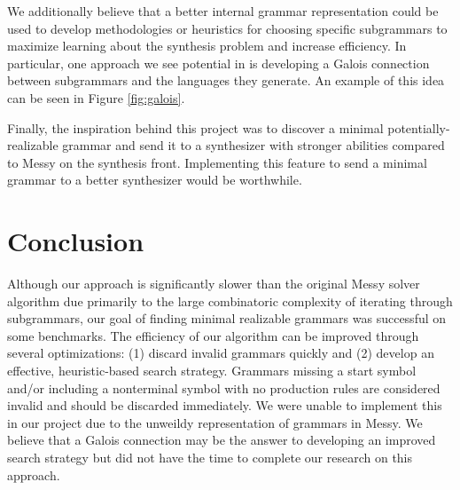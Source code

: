 \documentclass[acmsmall, nonacm]{acmart}
\begin{document}
We additionally believe that a better internal grammar representation could be used to develop methodologies or heuristics for choosing specific subgrammars to maximize learning about the synthesis problem and increase efficiency. In particular, one approach we see potential in is developing a Galois connection between subgrammars and the languages they generate. An example of this idea can be seen in Figure \ref{fig:galois}.

Finally, the inspiration behind this project was to discover a minimal potentially-realizable grammar and send it to a synthesizer with stronger abilities compared to Messy on the synthesis front. Implementing this feature to send a minimal grammar to a better synthesizer would be worthwhile.

\section{Conclusion}
Although our approach is significantly slower than the original Messy solver algorithm due primarily to the large combinatoric complexity of iterating through subgrammars, our goal of finding minimal realizable grammars was successful on some benchmarks. The efficiency of our algorithm can be improved through several optimizations: (1) discard invalid grammars quickly and (2) develop an effective, heuristic-based search strategy. Grammars missing a start symbol and/or including a nonterminal symbol with no production rules are considered invalid and should be discarded immediately. We were unable to implement this in our project due to the unweildy representation of grammars in Messy. We believe that a Galois connection may be the answer to developing an improved search strategy but did not have the time to complete our research on this approach.



\end{document}
